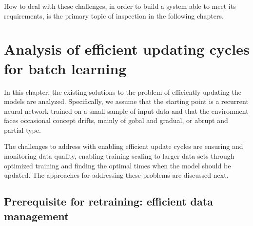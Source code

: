How to deal with these challenges, in order to build a system able to meet its requirements, is the primary topic of inspection in the following chapters.







\chapter{Analysis of efficient updating cycles for batch learning}

In this chapter, the existing solutions to the problem of efficiently updating the models are analyzed. Specifically, we assume that the starting point is a recurrent neural network trained on a small sample of input data and that the environment faces occasional concept drifts, mainly of gobal and gradual, or abrupt and partial type.

The challenges to address with enabling efficient update cycles are ensuring and monitoring data quality, enabling training scaling to larger data sets through optimized training and finding the optimal times when the model should be updated. The approaches for addressing these problems are discussed next.

\section[Prerequisite for retraining: efficient data management]{Prerequisite for retraining: efficient data \\management}

